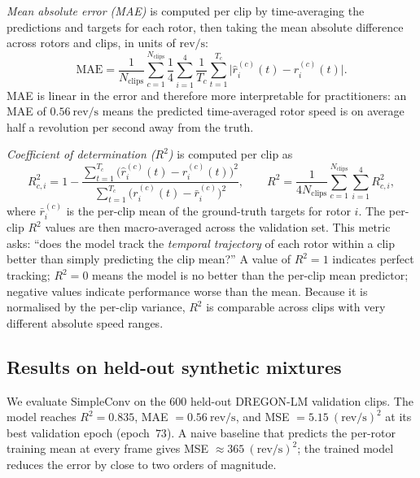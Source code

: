 \documentclass{QD_2026}
\newcommand{\revps}{\mathrm{rev}/\mathrm{s}}
\newcommand{\rsq}{R^{2}}
\begin{document}
\textit{Mean absolute error (MAE)} is computed per clip by time-averaging the predictions and targets for each
    rotor, then taking the mean absolute difference across rotors and clips,
    in units of $\revps$:
    \begin{equation}
      \mathrm{MAE} = \frac{1}{N_{\text{clips}}}\sum_{c=1}^{N_{\text{clips}}}
        \frac{1}{4}\sum_{i=1}^{4} \frac{1}{T_{c}}\sum_{t=1}^{T_{c}}
        \bigl|\hat{r}_{i}^{(c)}(t) - r_{i}^{(c)}(t)\bigr|.
    \end{equation}
    MAE is linear in the error and therefore more interpretable for
    practitioners: an MAE of $0.56~\revps$ means the predicted time-averaged
    rotor speed is on average half a revolution per second away from the truth.

\textit{Coefficient of determination ($\rsq$)} is computed per clip as
    \begin{equation}
      R^{2}_{c,i} = 1 - \frac{\sum_{t=1}^{T_{c}}
        \bigl(\hat{r}_{i}^{(c)}(t) - r_{i}^{(c)}(t)\bigr)^{2}}
        {\sum_{t=1}^{T_{c}} \bigl(r_{i}^{(c)}(t) - \bar{r}_{i}^{(c)}\bigr)^{2}},
      \qquad
      R^{2} = \frac{1}{4N_{\text{clips}}}\sum_{c=1}^{N_{\text{clips}}}
        \sum_{i=1}^{4} R^{2}_{c,i},
    \end{equation}
    where $\bar{r}_{i}^{(c)}$ is the per-clip mean of the ground-truth targets
    for rotor $i$. The per-clip $\rsq$ values are then macro-averaged across the
    validation set. This metric asks: ``does the model track the \emph{temporal
    trajectory} of each rotor within a clip better than simply predicting the
    clip mean?'' A value of $\rsq = 1$ indicates perfect tracking; $\rsq = 0$
    means the model is no better than the per-clip mean predictor; negative
    values indicate performance worse than the mean. Because it is normalised
    by the per-clip variance, $\rsq$ is comparable across clips with very
    different absolute speed ranges.


\subsection{Results on held-out synthetic mixtures}
\label{sec:heldout}

We evaluate SimpleConv on the $600$ held-out DREGON-LM validation clips.
The model reaches $\rsq = 0.835$, MAE $= 0.56~\revps$, and
MSE $= 5.15~(\revps)^{2}$ at its best validation epoch (epoch~$73$).
A naive baseline that predicts the per-rotor training mean at every frame gives
MSE $\approx 365~(\revps)^{2}$; the trained model reduces the error by close to
two orders of magnitude.
\end{document}
